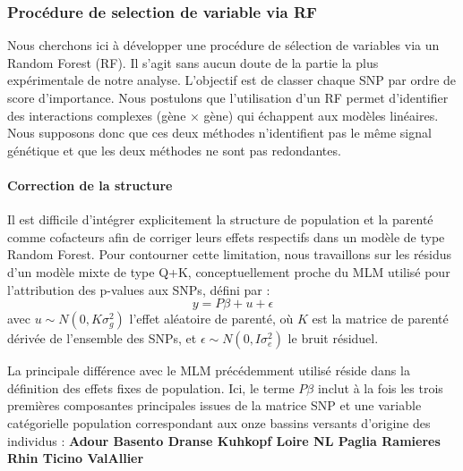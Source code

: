 \documentclass[
  11pt,
  letterpaper,
  DIV=11,
  numbers=noendperiod]{scrartcl}
\let\oldparagraph\paragraph
\renewcommand{\paragraph}[1]{\oldparagraph{#1}\mbox{}}
\begin{document}
\hypertarget{procuxe9dure-de-selection-de-variable-via-rf}{%
\subsubsection{Procédure de selection de variable via
RF}\label{procuxe9dure-de-selection-de-variable-via-rf}}

Nous cherchons ici à développer une procédure de sélection de variables
via un Random Forest (RF). Il s'agit sans aucun doute de la partie la
plus expérimentale de notre analyse. L'objectif est de classer chaque
SNP par ordre de score d'importance. Nous postulons que l'utilisation
d'un RF permet d'identifier des interactions complexes (gène × gène) qui
échappent aux modèles linéaires. Nous supposons donc que ces deux
méthodes n'identifient pas le même signal génétique et que les deux
méthodes ne sont pas redondantes.

\hypertarget{correction-de-la-structure}{%
\paragraph{Correction de la
structure}\label{correction-de-la-structure}}

Il est difficile d'intégrer explicitement la structure de population et
la parenté comme cofacteurs afin de corriger leurs effets respectifs
dans un modèle de type Random Forest. Pour contourner cette limitation,
nous travaillons sur les résidus d'un modèle mixte de type Q+K,
conceptuellement proche du MLM utilisé pour l'attribution des p-values
aux SNPs, défini par : \[y = P\beta + u + \epsilon\] avec
\(u \sim N(0, K\sigma_{g}^2)\) l'effet aléatoire de parenté, où \(K\)
est la matrice de parenté dérivée de l'ensemble des SNPs, et
\(\epsilon \sim N(0, I\sigma_{e}^2)\) le bruit résiduel.

La principale différence avec le MLM précédemment utilisé réside dans la
définition des effets fixes de population. Ici, le terme \(P\beta\)
inclut à la fois les trois premières composantes principales issues de
la matrice SNP et une variable catégorielle population correspondant aux
onze bassins versants d'origine des individus : \textbf{Adour \textbar{}
Basento \textbar{} Dranse \textbar{} Kuhkopf \textbar{} Loire \textbar{}
NL \textbar{} Paglia \textbar{} Ramieres \textbar{} Rhin \textbar{}
Ticino \textbar{} ValAllier}
\end{document}
